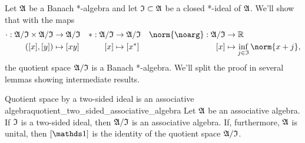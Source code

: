Let \(\mathfrak{A}\) be a Banach *-algebra and let \(\mathfrak{I}\subset \mathfrak{A}\) be a  closed *-ideal of \(\mathfrak{A}\). We'll show that with the maps
\begin{align*}
    \cdot : \algebra{A}/\algebra{I} \times \algebra{A}/\algebra{I} &\to \algebra{A}/\algebra{I}&
    * : \algebra{A}/\algebra{I} &\to \algebra{A}/\algebra{I}&
    \norm{\noarg} : \algebra{A}/\algebra{I} &\to \mathbb{R}\\
    ([x],[y]) &\mapsto [xy]&
    [x] &\mapsto [x^*]&
    [x] &\mapsto \inf_{j \in \algebra{I}}{\norm{x + j}},
\end{align*}
the quotient space \(\mathfrak{A}/\mathfrak{I}\) is a Banach *-algebra. We'll split the proof in several lemmas showing intermediate results.

\begin{lemma}{Quotient space by a two-sided ideal is an associative algebra}{quotient_two_sided_associative_algebra}
    Let \(\mathfrak{A}\) be an associative algebra. If \(\mathfrak{I}\) is a two-sided ideal, then \(\mathfrak{A}/\mathfrak{I}\) is an associative algebra. If, furthermore, \(\mathfrak{A}\) is unital, then \([\unity]\) is the identity of the quotient space \(\mathfrak{A}/\mathfrak{I}\).
\end{lemma}
